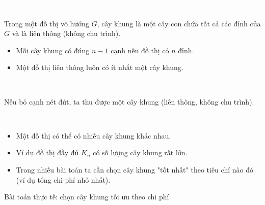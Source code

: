 \documentclass{beamer}
\newcommand{\hlblue}[1]{\textcolor{myblue}{#1}}
\newcommand{\hlgreen}[1]{\textcolor{mygreen}{#1}}
\newcommand{\hlred}[1]{\textcolor{myred}{#1}}
\newcommand{\hlpurple}[1]{\textcolor{mypurple}{#1}}
\newcommand{\hlorange}[1]{\textcolor{myorange}{#1}}
\newcommand{\hlwhite}[1]{\textcolor{white}{#1}}
\begin{document}

\begin{frame}{\hlwhite{Cây khung (Spanning Tree)}}
\begin{tcolorbox}[title=\textbf{\hlgreen{Định nghĩa}}]
Trong một đồ thị vô hướng $G$, \hlblue{cây khung} là một cây con chứa \hlred{tất cả các đỉnh} của $G$ và là \hlgreen{liên thông} (không chu trình).
\end{tcolorbox}

\begin{itemize}
  \item Mỗi cây khung có đúng \hlred{$n-1$ cạnh} nếu đồ thị có \hlblue{$n$ đỉnh}.
  \item Một đồ thị \hlgreen{liên thông} luôn có ít nhất một cây khung.
\end{itemize}
\end{frame}


\begin{frame}{\hlwhite{Ví dụ cây khung}}
\centering
{}

\vspace{0.25cm}
\hlpurple{Nếu bỏ cạnh nét đứt, ta thu được một cây khung (liên thông, không chu trình).}
\end{frame}


\begin{frame}{\hlwhite{Số lượng và lựa chọn cây khung}}
\begin{itemize}
  \item Một đồ thị có thể có \hlpurple{nhiều cây khung khác nhau}.
  \item Ví dụ đồ thị đầy đủ \hlblue{$K_n$} có số lượng cây khung rất lớn.
  \item Trong nhiều bài toán ta cần chọn cây khung \hlred{"tốt nhất"} theo tiêu chí nào đó (ví dụ \hlorange{tổng chi phí nhỏ nhất}).
\end{itemize}

\begin{tcolorbox}
\centering
\hlblue{Bài toán thực tế: chọn cây khung tối ưu theo chi phí}
\end{tcolorbox}
\end{frame}
\end{document}

